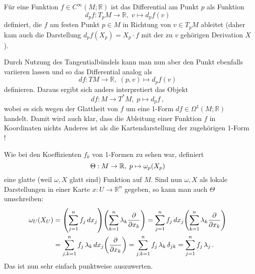 \documentclass[../H_Analysis_main.tex]{subfiles}
\begin{document}
\begin{bsp}
Für eine Funktion $f \in C^\infty(M; \mathbb{R})$ ist das Differential am Punkt $p$ als Funktion
\begin{equation*}
d_p f: T_p M \rightarrow \mathbb{R}, \; v \mapsto d_p f(v)
\end{equation*}
definiert, die $f$ am festen Punkt $p \in M$ in Richtung von $v \in T_p M$ ableitet (daher kam auch die Darstellung $d_p f(X_p) = X_p \cdot f$ mit der zu $v$ gehörigen Derivation $X$).

Durch Nutzung des Tangentialbündels kann man nun aber den Punkt ebenfalls variieren lassen und so das Differential analog als
\begin{equation}
df: TM \rightarrow \mathbb{R}, \; (p, v) \mapsto d_p f(v)
\end{equation}
definieren. Daraus ergibt sich anders interpretiert das Objekt
\begin{equation}
df: M \rightarrow T^* M, \; p \mapsto d_p f \, ,
\end{equation}
wobei es sich wegen der Glattheit von $f$ um eine 1-Form $df \in \Omega^1(M; \mathbb{R})$ handelt. Damit wird auch klar, dass die Ableitung einer Funktion $f$ in Koordinaten nichts Anderes ist als die Kartendarstellung der zugehörigen 1-Form !
\end{bsp}

\begin{bsp}\label{bsp:1fveklokal}
Wie bei den Koeffizienten $f_k$ von 1-Formen zu sehen war, definiert
\begin{equation}
\Theta: M \rightarrow \mathbb{R}, \; p \mapsto \omega_p\qty(X_p)
\end{equation}
eine glatte (weil $\omega, X$ glatt sind) Funktion auf $M$. Sind nun $\omega, X$ als lokale Darstellungen in einer Karte $x: U \rightarrow \mathbb{R}^n$ gegeben, so kann man auch $\Theta$ umschreiben:
\begin{equation}
\begin{split}
\omega_U\qty(X_U) &= \qty(\sum_{j = 1}^n f_j \, dx_j) \qty(\sum_{k = 1}^n \lambda_k \pdv{x_k}) = \sum_{j = 1}^n f_j \, dx_j\qty(\sum_{k = 1}^n \lambda_k \pdv{x_k})
\\
&= \sum_{j, k = 1}^n f_j \, \lambda_k \, dx_j\qty(\pdv{x_k}) = \sum_{j, k = 1}^n f_j \, \lambda_k \, \delta_{jk} = \sum_{j = 1}^n f_j \, \lambda_j \, .
\end{split}
\end{equation}
Das ist nun sehr einfach punktweise auszuwerten.
\end{bsp}
\end{document}
